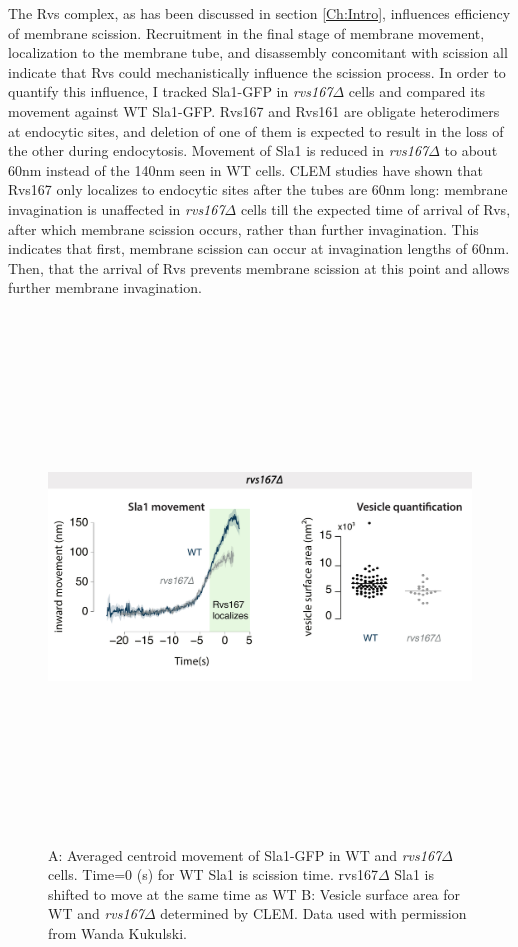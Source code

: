 The Rvs complex, as has been discussed in section \ref{Ch:Intro}, influences efficiency of membrane scission. Recruitment in the final stage of membrane movement, localization to the membrane tube, and  disassembly concomitant with scission all indicate that Rvs could mechanistically influence the scission process. In order to quantify this influence, I tracked Sla1-GFP in \textit{rvs167$\Delta$} cells and compared its movement against WT Sla1-GFP. Rvs167 and Rvs161 are obligate heterodimers at endocytic sites, and deletion of one of them is expected to result in the loss of the other during endocytosis. Movement of Sla1 is reduced in \textit{rvs167$\Delta$} to about 60nm instead of the 140nm seen in WT cells. CLEM studies have shown that Rvs167 only localizes to endocytic sites after the tubes are 60nm long: membrane invagination is unaffected in \textit{rvs167$\Delta$} cells till the expected time of arrival of Rvs, after which membrane scission occurs, rather than further invagination. This indicates that first, membrane scission can occur at invagination lengths of 60nm. Then, that the arrival of Rvs prevents membrane scission at this point and allows further membrane invagination. 

\begin{figure}[h]
	\centering
	\includegraphics[width=14cm,height=14cm,keepaspectratio, valign=t]{figures/results_final/rvsdeletion}
	\caption[some stuff]
	{A: Averaged centroid movement of Sla1-GFP in WT and \textit{rvs167$\Delta$} cells. Time=0 (s) for WT Sla1 is scission time. rvs167$\Delta$ Sla1 is shifted to move at the same time as WT B: Vesicle surface area for WT and \textit{rvs167$\Delta$} determined by CLEM. Data used with permission from Wanda Kukulski.
	\label{fig2_rvsdelta}
	}
\end{figure}



